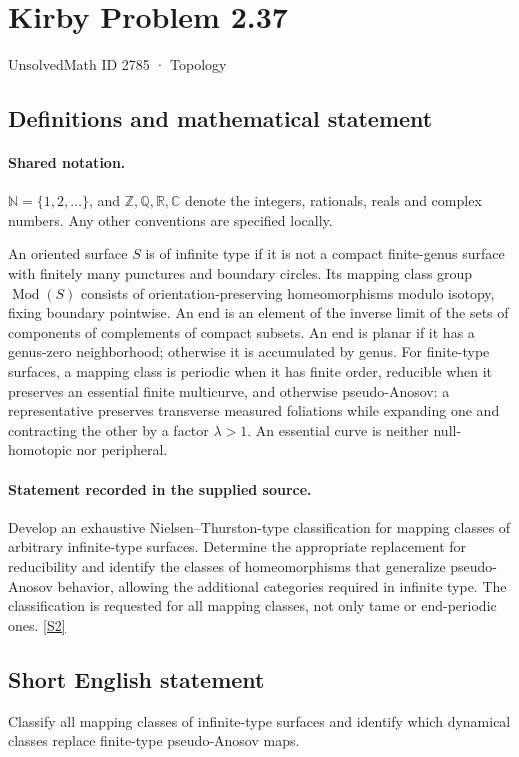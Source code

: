 \documentclass[11pt]{article}
\newcommand{\sref}[2]{\hyperlink{source:#1:#2}{[S#2]}}
\begin{document}
\setcounter{section}{2784}
\section{Kirby Problem 2.37}\label{2785}
{\small\sffamily UnsolvedMath ID 2785 · Topology}
\subsection{Definitions and mathematical statement}

\paragraph{Shared notation.}$\mathbb N=\{1,2,\ldots\}$, and $\mathbb Z,\mathbb Q,\mathbb R,\mathbb C$ denote the integers, rationals, reals and complex numbers. Any other conventions are specified locally.


An oriented surface $S$ is of infinite type if it is not a compact finite-genus surface with finitely many punctures and boundary circles. Its mapping class group $\operatorname{Mod}(S)$ consists of orientation-preserving homeomorphisms modulo isotopy, fixing boundary pointwise. An end is an element of the inverse limit of the sets of components of complements of compact subsets. An end is planar if it has a genus-zero neighborhood; otherwise it is accumulated by genus. For finite-type surfaces, a mapping class is periodic when it has finite order, reducible when it preserves an essential finite multicurve, and otherwise pseudo-Anosov: a representative preserves transverse measured foliations while expanding one and contracting the other by a factor $\lambda>1$. An essential curve is neither null-homotopic nor peripheral.
\paragraph{Statement recorded in the supplied source.}
Develop an exhaustive Nielsen--Thurston-type classification for mapping classes of arbitrary infinite-type surfaces. Determine the appropriate replacement for reducibility and identify the classes of homeomorphisms that generalize pseudo-Anosov behavior, allowing the additional categories required in infinite type. The classification is requested for all mapping classes, not only tame or end-periodic ones. \sref{2785}{2}

\subsection{Short English statement}
Classify all mapping classes of infinite-type surfaces and identify which dynamical classes replace finite-type pseudo-Anosov maps.
\end{document}
